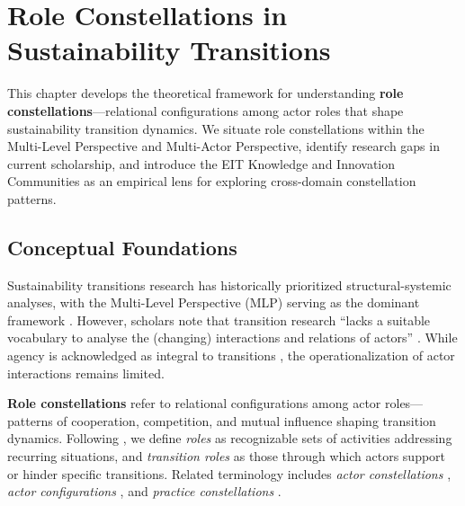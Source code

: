 \documentclass[
    fontsize=10pt,
    twoside=true,
    secnumdepth=2,
    numbers=noenddot
]{kaobook}
\begin{document}
\chapter{Role Constellations in Sustainability Transitions}
\margintoc

\begin{chapteroverview}
This chapter develops the theoretical framework for understanding \textbf{role constellations}---relational configurations among actor roles that shape sustainability transition dynamics. We situate role constellations within the Multi-Level Perspective and Multi-Actor Perspective, identify research gaps in current scholarship, and introduce the EIT Knowledge and Innovation Communities as an empirical lens for exploring cross-domain constellation patterns.
\end{chapteroverview}

\section{Conceptual Foundations}

Sustainability transitions research has historically prioritized structural-systemic analyses, with the Multi-Level Perspective (MLP) serving as the dominant framework \citep{geels2002technological}. However, scholars note that transition research ``lacks a suitable vocabulary to analyse the (changing) interactions and relations of actors'' \citep[p.~45]{wittmayer2017actor}. While agency is acknowledged as integral to transitions \citep{geels2011multi}, the operationalization of actor interactions remains limited.

\textbf{Role constellations} refer to relational configurations among actor roles---patterns of cooperation, competition, and mutual influence shaping transition dynamics. Following \citet{wittmayer2017actor}, we define \textit{roles} as recognizable sets of activities addressing recurring situations, and \textit{transition roles} as those through which actors support or hinder specific transitions. Related terminology includes \textit{actor constellations} \citep{kriesi2001swiss}, \textit{actor configurations} \citep{avelino2016shifting}, and \textit{practice constellations} \citep{shove2012dynamics}.

\end{document}
